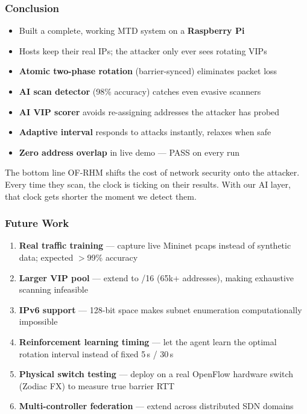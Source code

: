 \documentclass{beamer}
\begin{document}
\begin{frame}
\frametitle{Conclusion}

\begin{itemize}
  \item Built a complete, working MTD system on a \textbf{Raspberry Pi}
  \item Hosts keep their real IPs; the attacker only ever sees rotating VIPs
  \item \textbf{Atomic two-phase rotation} (barrier-synced) eliminates packet loss
  \item \textbf{AI scan detector} (98\% accuracy) catches even evasive scanners
  \item \textbf{AI VIP scorer} avoids re-assigning addresses the attacker has probed
  \item \textbf{Adaptive interval} responds to attacks instantly, relaxes when safe
  \item \textbf{Zero address overlap} in live demo --- PASS on every run
\end{itemize}

\vspace{8pt}
\begin{block}{The bottom line}
OF-RHM shifts the cost of network security onto the attacker.
Every time they scan, the clock is ticking on their results.
With our AI layer, that clock gets shorter the moment we detect them.
\end{block}

\end{frame}

\begin{frame}
\frametitle{Future Work}

\begin{enumerate}
  \item \textbf{Real traffic training} --- capture live Mininet pcaps
        instead of synthetic data; expected $>$99\% accuracy
  \item \textbf{Larger VIP pool} --- extend to /16 (65k+ addresses),
        making exhaustive scanning infeasible
  \item \textbf{IPv6 support} --- 128-bit space makes subnet enumeration
        computationally impossible
  \item \textbf{Reinforcement learning timing} --- let the agent learn
        the optimal rotation interval instead of fixed 5\,s / 30\,s
  \item \textbf{Physical switch testing} --- deploy on a real OpenFlow
        hardware switch (Zodiac FX) to measure true barrier RTT
  \item \textbf{Multi-controller federation} --- extend across
        distributed SDN domains
\end{enumerate}

\end{frame}
\end{document}
